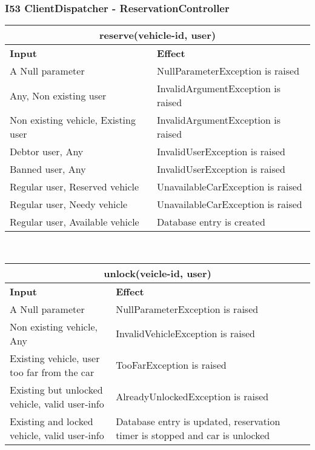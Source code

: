 \subsubsection{I53 ClientDispatcher - ReservationController}

\begin{tabular}{|p{5cm}|p{7cm}|}
\hline
\multicolumn{2}{|c|}{reserve(vehicle-id, user)} \\
\hline
\textbf{Input} & \textbf{Effect} \\

\hline
A Null parameter & NullParameterException is raised \\

\hline
Any, Non existing user & InvalidArgumentException is raised \\
\hline
Non existing vehicle, Existing user & InvalidArgumentException is raised \\

\hline
Debtor user, Any & InvalidUserException is raised \\

\hline
Banned user, Any & InvalidUserException is raised \\

\hline
Regular user, Reserved vehicle  & UnavailableCarException is raised \\

\hline
Regular user, Needy vehicle & UnavailableCarException is raised \\

\hline
Regular user, Available vehicle & Database entry is created \\
\hline
\end{tabular}
\\
\begin{tabular}{|p{5cm}|p{7cm}|}
\hline
\multicolumn{2}{|c|}{unlock(veicle-id, user)} \\
\hline
\textbf{Input} & \textbf{Effect} \\

\hline
A Null parameter & NullParameterException is raised \\

\hline
Non existing vehicle, Any & InvalidVehicleException is raised \\

\hline
Existing vehicle, user too far from the car & TooFarException is raised \\

\hline
Existing but unlocked vehicle, valid user-info & AlreadyUnlockedException is raised \\

\hline
Existing and locked vehicle, valid user-info & Database entry is updated, reservation timer is stopped and car is unlocked \\
\hline
\end{tabular}
